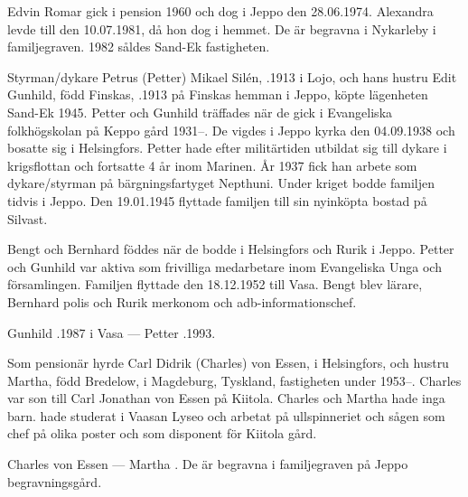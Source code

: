 Edvin Romar gick i pension 1960 och dog i Jeppo den 28.06.1974. Alexandra levde till den 10.07.1981, då hon dog i hemmet. De är begravna i Nykarleby i familjegraven. 1982 såldes Sand-Ek fastigheten.


%
Styrman/dykare Petrus (Petter) Mikael Silén, .1913 i Lojo, och hans hustru Edit Gunhild, född Finskas, .1913 på Finskas hemman i Jeppo, köpte lägenheten Sand-Ek 1945. Petter och Gunhild träffades när de gick i Evangeliska folkhögskolan på Keppo gård 1931--. De vigdes i Jeppo kyrka den 04.09.1938 och bosatte sig i Helsingfors. Petter hade efter militärtiden utbildat sig till dykare i krigsflottan och fortsatte 4 år inom Marinen. År 1937 fick han arbete som dykare/styrman på bärgningsfartyget Nepthuni. Under kriget bodde familjen tidvis i Jeppo. Den 19.01.1945 flyttade familjen till sin nyinköpta bostad på Silvast.
\begin{jhchildren}
  \item {}
  \item {}
  \item {}
\end{jhchildren}
Bengt och Bernhard föddes när de bodde i Helsingfors och Rurik i Jeppo. Petter och Gunhild var aktiva som frivilliga medarbetare inom Evangeliska Unga och församlingen. Familjen flyttade den 18.12.1952 till Vasa. Bengt blev lärare, Bernhard polis och Rurik merkonom och adb-informationschef.

Gunhild .1987 i Vasa  ---  Petter .1993.


Som pensionär hyrde Carl Didrik (Charles) von Essen,  i Helsingfors, och hustru Martha, född Bredelow,  i Magdeburg, Tyskland, fastigheten under 1953--. Charles var son till Carl Jonathan von Essen på Kiitola. Charles och Martha hade inga barn.  hade studerat i Vaasan Lyseo och arbetat på ullspinneriet och sågen som chef på olika poster och som disponent för Kiitola gård.

Charles von Essen   ---  Martha . De är begravna i familjegraven på Jeppo begravningsgård.

